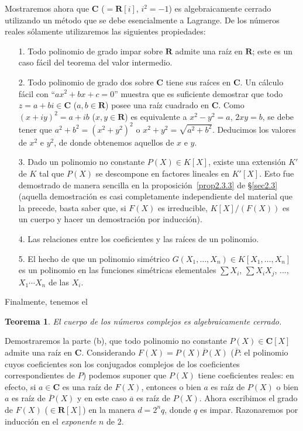 \documentclass[bibtotoc,leqno,spanish]{amsbook}
\newcommand{\RR}{\mathbf{R}}
\newcommand{\CC}{\mathbf{C}}
\newcommand{\oline}[1]{\overline{#1}}
\numberwithin{equation}{section}
\theoremstyle{note}
\theoremstyle{note}
\newtheorem*{theorem*}{Teorema}
\theoremstyle{rem}
\numberwithin{theorem}{section}
\numberwithin{proposition}{section}
\numberwithin{definition}{section}
\numberwithin{lemma}{section}
\numberwithin{corollary}{section}
\numberwithin{example}{section}
\numberwithin{footnote}{section}%
\begin{document}
Mostraremos ahora que $\CC$ ($=\RR[i]$, $i^{2}=-1$) es algebraicamente cerrado utilizando un m\'etodo
que se debe esencialmente a Lagrange. De los n\'umeros reales s\'olamente utilizaremos
las siguientes propiedades:
\begin{enumerate}
\item[1.] Todo polinomio de grado impar sobre $\RR$ admite una ra\'iz en $\RR$; este es un caso f\'acil del teorema
del valor intermedio.
\item[2.] Todo polinomio de grado dos sobre $\CC$ tiene sus ra\'ices en $\CC$. Un c\'alculo f\'acil con
``$ax^{2}+bx+c=0$'' muestra que es suficiente demostrar que todo $z=a+bi\in\CC$ ($a,b\in\RR$) posee una
ra\'iz cuadrado en $\CC$. Como $(x+iy)^{2}=a+ib$ ($x,y\in\RR$) es equivalente a $x^{2}-y^{2}=a$,
$2xy = b$, se debe tener que $a^{2}+b^{2}=(x^{2}+y^{2})^{2}$ o $x^{2}+y^{2} = \sqrt{a^{2}+b^{2}}$. Deducimos
los valores de $x^{2}$ e $y^{2}$, de donde obtenemos aquellos de $x$ e $y$.
\item[3.] Dado un polinomio no constante $P(X)\in K[X]$, existe una extensi\'on $K'$ de $K$ tal que
$P(X)$ se descompone en factores lineales en $K'[X]$. Esto fue demostrado de manera sencilla en la
proposici\'on~\ref{prop2.3.3} de \S\ref{sec2.3} (aquella demostraci\'on es casi completamente independiente del material que la precede,
basta saber que, si $F(X)$ es irreducible, $K[X]/(F(X))$ es un cuerpo y hacer un demostraci\'on por inducci\'on).
\item[4.] Las relaciones entre los coeficientes y las ra\'ices de un polinomio.
\item[5.] El hecho de que un polinomio sim\'etrico $G(X_{1},\dots,X_{n})\in K[X_{1},\dots,X_{n}]$ es un polinomio
en las funciones sim\'etricas elementales $\sum X_{i}$, $\sum X_{i}X_{j}$, ..., $X_{1}\cdots X_{n}$ de las
$X_{i}$.
\end{enumerate}

Finalmente, tenemos el

\begin{theorem*}
El cuerpo de los n\'umeros complejos es algebraicamente cerrado.
\end{theorem*}

Demostraremos la parte (b), que todo polinomio no constante $P(X)\in\CC[X]$ admite una ra\'iz en
$\CC$. Considerando $F(X) = P(X)\oline P(X)$ ($\oline P$: el polinomio cuyos coeficientes son los
conjugados complejos de los coeficientes correspondientes de $P$) podemos suponer que $P(X)$ tiene
coeficientes reales: en efecto, si $a\in\CC$ es una ra\'iz de $F(X)$, entonces o bien $a$ es ra\'iz
de $P(X)$ o bien $a$ es ra\'iz de $\oline P(X)$ y en este caso $\oline a$ es ra\'iz de $P(X)$.
Ahora escribimos el grado de $F(X)$ ($\in\RR[X]$) en la manera $d = 2^{n}q$, donde $q$ es impar.
Razonaremos por inducci\'on en el {\em exponente} $n$ de $2$.
\end{document}
